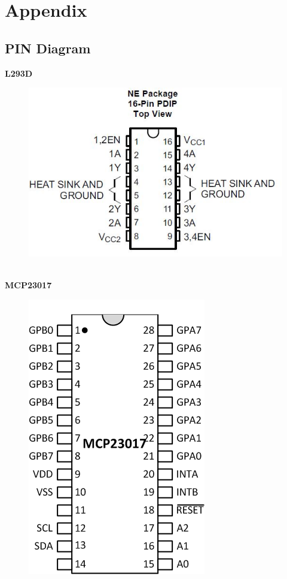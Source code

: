 \documentclass[11pt,a4paper]{article}
\begin{document}
	\section{Appendix}
	\subsection{PIN Diagram}
	\textbf{L293D}
	\begin{figure}[h!]
		\includegraphics[scale=0.5]{l293d.jpg}
		\centering
	\end{figure} \\
	\newpage
	\textbf{MCP23017}\\
	\begin{figure}[h!]
		\includegraphics[scale=0.4]{MCP23017.png}
		\centering
	\end{figure}  
\end{document}
